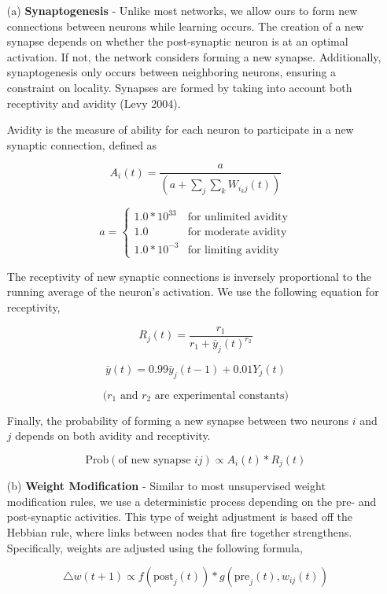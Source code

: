 \documentclass[journal]{./sty/IEEEtran}
\begin{document}
\begin{itemize}
\item[(a)] {\bf Synaptogenesis} - 
Unlike most networks, we allow ours to form new connections between neurons while learning occurs. 
The creation of a new synapse depends on whether the post-synaptic neuron is at an optimal activation. 
If not, the network considers forming a new synapse.
Additionally, synaptogenesis only occurs between neighboring neurons, ensuring a constraint on locality.
Synapses are formed by taking into account both receptivity and avidity (Levy 2004).

\vspace{0.3cm}

Avidity is the measure of ability for each neuron to participate in a new synaptic connection, defined as

\[
A_i(t)=\frac{a}{(a + \sum_j\sum_kW_{i_kj}(t))}
\]

\[
a = \left\{
\begin{array}{lr}
  1.0 * 10^{33} & \text{for unlimited avidity}\\
  1.0 & \text{for moderate avidity}\\
  1.0 * 10^{-3} & \text{for limiting avidity}
\end{array}
\right.
\]

The receptivity of new synaptic connections is inversely proportional to the running average of the neuron's activation.
We use the following equation for receptivity,

\[
R_j(t) = \frac{r_1}{r_1 + \bar{y}_j(t)^{r_2}}
\]

\[
\bar{y}(t) = 0.99 \bar{y}_j(t-1) + 0.01 Y_j(t)
\]

\[
\text{(\(r_1\) and \(r_2\) are experimental constants)}
\]

Finally, the probability of forming a new synapse between two neurons \(i\) and \(j\) depends on both avidity and receptivity. 

\[
\text{Prob}(\text{of new synapse } ij ) \propto A_i(t) * R_j(t)
\]

\item[(b)] {\bf Weight Modification} - 
Similar to most unsupervised weight modification rules, we use a deterministic process depending on the pre- and post-synaptic activities.
This type of weight adjustment is based off the Hebbian rule, where links between nodes that fire together strengthens.
Specifically, weights are adjusted using the following formula,

\[
\triangle w(t+1) \propto f(\text{post}_j(t))*g(\text{pre}_j(t), w_{ij}(t))
\]


\end{itemize}
\end{document}
